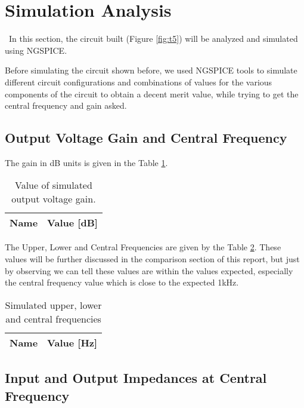 \newpage
{}
\section{Simulation Analysis}
\label{sec:simulation}

~In this section, the circuit built (Figure \ref{fig:t5}) will be analyzed and simulated using NGSPICE. 

Before simulating the circuit shown before, we used NGSPICE tools to simulate different circuit configurations and combinations of values for the various components of the circuit to obtain a decent merit value, while trying to get the central frequency and gain asked. \par


\subsection{Output Voltage Gain and Central Frequency}

The gain in dB units is given in the Table \ref{tab:sim_gain}.

\begin{table}[H]
	\centering
	\begin{tabular}{|l|r|}
		\hline    
		{\bf Name} & {\bf Value [dB]} \\ \hline
		
	\end{tabular}
	\caption{Value of simulated output voltage gain.}
	\label{tab:sim_gain}
\end{table}

The Upper, Lower and Central Frequencies are given by the Table \ref{tab:sim_freq}. These values will be further discussed in the comparison section of this report, but just by observing we can tell these values are within the values expected, especially the central frequency value which is close to the expected 1kHz.

\begin{table}[H]
	\centering
	\begin{tabular}{|l|r|}
		\hline    
		{\bf Name} & {\bf Value [Hz]} \\ \hline
		
	\end{tabular}
	\caption{Simulated upper, lower and central frequencies}
	\label{tab:sim_freq}
\end{table}


\subsection{Input and Output Impedances at Central Frequency}

